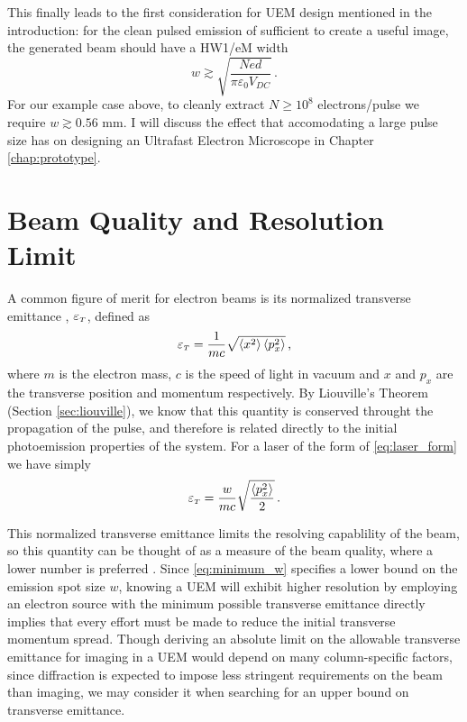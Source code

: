 This finally leads to the first consideration for UEM design mentioned in the introduction: for the clean pulsed emission of sufficient to create a useful image, the generated beam should have a HW1/eM width 
\begin{equation} \label{eq:minimum_w}
  w \gtrsim \sqrt{\frac{N e d}{\pi \varepsilon_0 V_{DC}}} \,\text{.}
\end{equation}
For our example case above, to cleanly extract $N \ge 10^8$ electrons/pulse we require $w \gtrsim 0.56 \text{ mm}$.
I will discuss the effect that accomodating a large pulse size has on designing an Ultrafast Electron Microscope in Chapter \ref{chap:prototype}. 

\section{Beam Quality and Resolution Limit}

A common figure of merit for electron beams is its normalized transverse emittance \cite{jensen_emittance_2010}, $\varepsilon_{{\scriptscriptstyle T}}$, defined as 
\begin{equation} \label{eq:emittance_definition}
  \varepsilon_{{\scriptscriptstyle T}} = \frac{1}{m c} \sqrt{ \left < x^2 \right > \left < p_x^2 \right > } \,\text{,}
\end{equation}
where $m$ is the electron mass, $c$ is the speed of light in vacuum and $x$ and $p_x$ are the transverse position and momentum respectively.
By Liouville's Theorem (Section \ref{sec:liouville}), we know that this quantity is conserved throught the propagation of the pulse, and therefore is related directly to the initial photoemission properties of the system.
For a laser of the form of \ref{eq:laser_form} we have simply
\begin{equation} \label{eq:emittance_definition_w}
  \varepsilon_{{\scriptscriptstyle T}} = \frac{w}{m c} \sqrt{ \frac{\left < p_x^2 \right >}{2} } \,\text{.}
\end{equation}

This normalized transverse emittance limits the resolving capablility of the beam, so this quantity can be thought of as a measure of the beam quality, where a lower number is preferred \cite{berger_dc_2009}.
Since \ref{eq:minimum_w} specifies a lower bound on the emission spot size $w$, knowing a UEM will exhibit higher resolution by employing an electron source with the minimum possible transverse emittance directly implies that every effort must be made to reduce the initial transverse momentum spread.
Though deriving an absolute limit on the allowable transverse emittance for imaging in a UEM would depend on many column-specific factors, since diffraction is expected to impose less stringent requirements on the beam than imaging, we may consider it when searching for an upper bound on transverse emittance.

